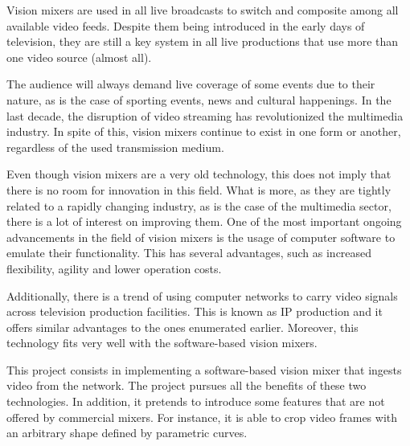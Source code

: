\documentclass[../main.tex]{subfiles}
\begin{document}
Vision mixers are used in all live broadcasts to switch and composite among all available video feeds. Despite them being introduced in the early days of television, they are still a key system in all live productions that use more than one video source (almost all).\newline

The audience will always demand live coverage of some events due to their nature, as is the case of sporting events, news and cultural happenings. In the last decade, the disruption of video streaming has revolutionized the multimedia industry. In spite of this, vision mixers continue to exist in one form or another, regardless of the used transmission medium.\newline

Even though vision mixers are a very old technology, this does not imply that there is no room for innovation in this field. What is more, as they are tightly related to a rapidly changing industry, as is the case of the multimedia sector, there is a lot of interest on improving them. One of the most important ongoing advancements in the field of vision mixers is the usage of computer software to emulate their functionality. This has several advantages, such as increased flexibility, agility and lower operation costs.\newline

Additionally, there is a trend of using computer networks to carry video signals across television production facilities. This is known as IP production and it offers similar advantages to the ones enumerated earlier. Moreover, this technology fits very well with the software-based vision mixers.\newline

This project consists in implementing a software-based vision mixer that ingests video from the network. The project pursues all the benefits of these two technologies. In addition, it pretends to introduce some features that are not offered by commercial mixers. For instance, it is able to crop video frames with an arbitrary shape defined by parametric curves.\newline
\end{document}
